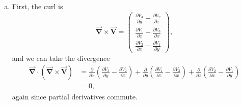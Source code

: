 \documentclass[12pt]{article} %
\newcommand{\grad}{\boldsymbol{\vec{\nabla}}}
\newcommand{\vecfieldV}{\boldsymbol{\vec{V}}}
\begin{document}
\begin{solution}
\begin{enumerate}[(a)]
        \item First, the curl is
        \[
        \grad \times \vecfieldV = \begin{pmatrix} \frac{\partial V_3}{\partial y} - \frac{\partial V_2}{\partial z} \\ \frac{\partial V_1}{\partial z} - \frac{\partial V_3}{\partial x} \\ \frac{\partial V_2}{\partial x} - \frac{\partial V_1}{\partial y} \end{pmatrix},
        \]
        and we can take the divergence
        \begin{align*}
            \grad \cdot \left(\grad \times \vecfieldV\right) &= \frac{\partial}{\partial x} \left(\frac{\partial V_3}{\partial y} - \frac{\partial V_2}{\partial z}\right) +  \frac{\partial}{\partial y} \left(\frac{\partial V_1}{\partial z} - \frac{\partial V_3}{\partial x}\right) +  \frac{\partial}{\partial z} \left(\frac{\partial V_2}{\partial x} - \frac{\partial V_1}{\partial y}\right)\\
            &= 0,
        \end{align*}
        again since partial derivatives commute.
    \end{enumerate}
\end{solution}
\end{document}
